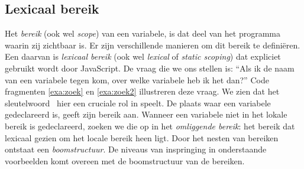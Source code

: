 \subsection{Lexicaal bereik}

Het \emph{bereik} (ook wel \emph{scope}) van een variabele, is dat deel van het programma waarin zij zichtbaar is. Er zijn verschillende manieren om dit bereik te definiëren. Een daarvan is \emph{lexicaal bereik} (ook wel \emph{lexical} of \emph{static scoping}) dat expliciet gebruikt wordt door JavaScript.
De vraag die we ons stellen is: ``Als ik de naam van een variabele tegen kom, over welke variabele heb ik het dan?'' Code fragmenten \ref{exa:zoek} en \ref{exa:zoek2} illustreren deze vraag. We zien dat het sleutelwoord \LOCAL\ hier een cruciale rol in speelt. De plaats waar een variabele gedeclareerd is, geeft zijn bereik aan. Wanneer een variabele niet in het lokale bereik is gedeclareerd, zoeken we die op in het \emph{omliggende bereik}: het bereik dat lexicaal gezien om het locale bereik heen ligt.
Door het nesten van bereiken ontstaat een \emph{boomstructuur}. De niveaus van inspringing in onderstaande voorbeelden komt overeen met de boomstructuur van de bereiken.%

\codeFragmentCaption
{}

\codeFragmentCaption
{}


